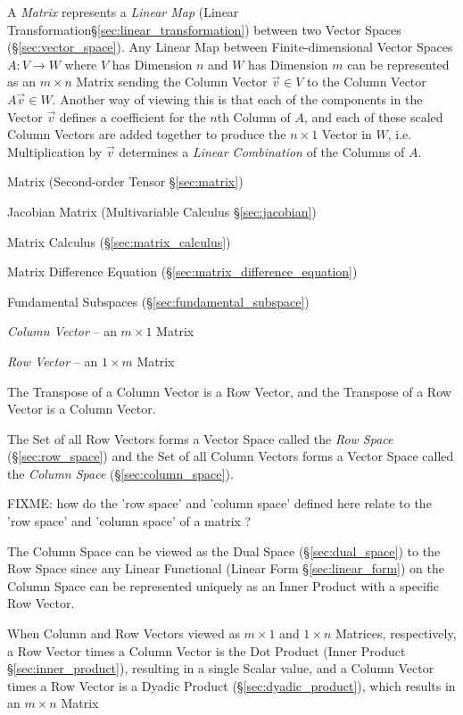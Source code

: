 A \emph{Matrix} represents a \emph{Linear Map} (Linear
Transformation\S\ref{sec:linear_transformation}) between two Vector Spaces
(\S\ref{sec:vector_space}). Any Linear Map between Finite-dimensional Vector
Spaces $A : V \rightarrow W$ where $V$ has Dimension $n$ and $W$ has Dimension
$m$ can be represented as an $m \times n$ Matrix sending the Column Vector
$\vec{v} \in V$ to the Column Vector $A\vec{v} \in W$. Another way of viewing
this is that each of the components in the Vector $\vec{v}$ defines a
coefficient for the $n$th Column of $A$, and each of these scaled Column
Vectors are added together to produce the $n \times 1$ Vector in $W$, i.e.
Multiplication by $\vec{v}$ determines a \emph{Linear Combination} of the
Columns of $A$.

\fist Matrix (Second-order Tensor \S\ref{sec:matrix})

\fist Jacobian Matrix (Multivariable Calculus \S\ref{sec:jacobian})

\fist Matrix Calculus (\S\ref{sec:matrix_calculus})

\fist Matrix Difference Equation (\S\ref{sec:matrix_difference_equation})

\fist Fundamental Subspaces (\S\ref{sec:fundamental_subspace})

\emph{Column Vector} -- an $m \times 1$ Matrix

\emph{Row Vector} -- an $1 \times m$ Matrix

The Transpose of a Column Vector is a Row Vector, and the Transpose of a Row
Vector is a Column Vector.

The Set of all Row Vectors forms a Vector Space called the \emph{Row Space}
(\S\ref{sec:row_space}) and the Set of all Column Vectors forms a Vector Space
called the \emph{Column Space} (\S\ref{sec:column_space}).

FIXME: how do the 'row space' and 'column space' defined here relate to the
'row space' and 'column space' of a matrix ?

The Column Space can be viewed as the Dual Space (\S\ref{sec:dual_space}) to
the Row Space since any Linear Functional (Linear Form \S\ref{sec:linear_form})
on the Column Space can be represented uniquely as an Inner Product with a
specific Row Vector.

When Column and Row Vectors viewed as $m \times 1$ and $1 \times n$ Matrices,
respectively, a Row Vector times a Column Vector is the Dot Product
(Inner Product \S\ref{sec:inner_product}), resulting in a single Scalar value,
and a Column Vector times a Row Vector is a Dyadic Product
(\S\ref{sec:dyadic_product}), which results in an $m \times n$ Matrix

